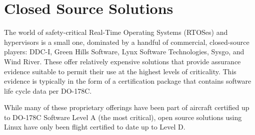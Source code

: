 \section{Closed Source Solutions}
\label{sec:closed-source-solutions}

The world of safety-critical Real-Time Operating Systems (RTOSes) and hypervisors is a small one, dominated by a handful of commercial, closed-source players: DDC-I, Green Hills Software, Lynx Software Technologies, Sysgo, and Wind River. These offer relatively expensive solutions that provide assurance evidence suitable to permit their use at the highest levels of criticality. This evidence is typically in the form of a certification package that contains software life cycle data per DO-178C. 

While many of these proprietary offerings have been part of aircraft certified up to DO-178C Software Level A (the most critical), open source solutions using Linux have only been flight certified to date up to Level D.
